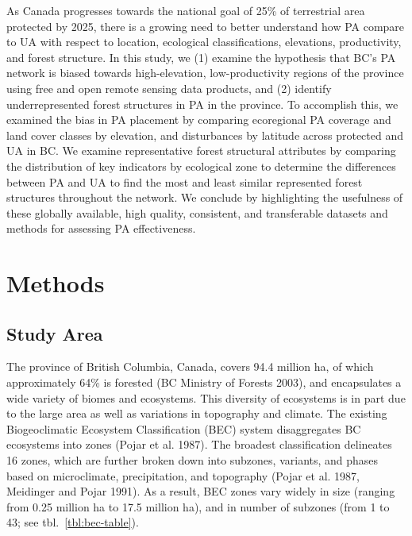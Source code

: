 \documentclass[10pt,oneside]{article}
\begin{document}
As Canada progresses towards the national goal of 25\% of terrestrial
area protected by 2025, there is a growing need to better understand how
PA compare to UA with respect to location, ecological classifications,
elevations, productivity, and forest structure. In this study, we (1)
examine the hypothesis that BC's PA network is biased towards
high-elevation, low-productivity regions of the province using free and
open remote sensing data products, and (2) identify underrepresented
forest structures in PA in the province. To accomplish this, we examined
the bias in PA placement by comparing ecoregional PA coverage and land
cover classes by elevation, and disturbances by latitude across
protected and UA in BC. We examine representative forest structural
attributes by comparing the distribution of key indicators by ecological
zone to determine the differences between PA and UA to find the most and
least similar represented forest structures throughout the network. We
conclude by highlighting the usefulness of these globally available,
high quality, consistent, and transferable datasets and methods for
assessing PA effectiveness.

\hypertarget{methods}{%
\section{Methods}\label{methods}}

\hypertarget{study-area}{%
\subsection{Study Area}\label{study-area}}

The province of British Columbia, Canada, covers 94.4 million ha, of
which approximately 64\% is forested (BC Ministry of Forests 2003), and
encapsulates a wide variety of biomes and ecosystems. This diversity of
ecosystems is in part due to the large area as well as variations in
topography and climate. The existing Biogeoclimatic Ecosystem
Classification (BEC) system disaggregates BC ecosystems into zones
(Pojar et al. 1987). The broadest classification delineates 16 zones,
which are further broken down into subzones, variants, and phases based
on microclimate, precipitation, and topography (Pojar et al. 1987,
Meidinger and Pojar 1991). As a result, BEC zones vary widely in size
(ranging from 0.25 million ha to 17.5 million ha), and in number of
subzones (from 1 to 43; see tbl.~\ref{tbl:bec-table}).
\end{document}
